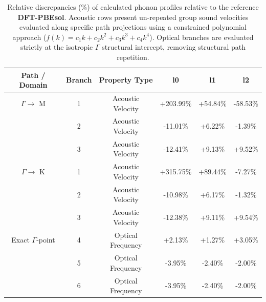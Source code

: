 \begin{table}[htbp]
  \centering
  \caption{Relative discrepancies (\%) of calculated phonon profiles relative to the reference \textbf{DFT-PBEsol}. Acoustic rows present un-repeated group sound velocities evaluated along specific path projections using a constrained polynomial approach ($f(k) = c_1 k + c_2 k^2 + c_3 k^3 + c_4 k^4$). Optical branches are evaluated strictly at the isotropic $\Gamma$ structural intercept, removing structural path repetition.}
  \label{tab:gamma_phonon_comparison}
  \begin{tabular}{cccccc}
    \hline\hline
    Path / Domain & Branch & Property Type  & l0 & l1 & l2 \\
    \hline
    \midrule $\Gamma \rightarrow$ M & 1 & Acoustic Velocity  & +203.99\% & +54.84\% & -58.53\% \\
                                   & 2 & Acoustic Velocity  & -11.01\% & +6.22\% & -1.39\% \\
                                   & 3 & Acoustic Velocity  & -12.41\% & +9.13\% & +9.52\% \\
    \midrule $\Gamma \rightarrow$ K & 1 & Acoustic Velocity  & +315.75\% & +89.44\% & -7.27\% \\
                                   & 2 & Acoustic Velocity  & -10.98\% & +6.17\% & -1.32\% \\
                                   & 3 & Acoustic Velocity  & -12.38\% & +9.11\% & +9.54\% \\
    \midrule Exact $\Gamma$-point  & 4 & Optical Frequency   & +2.13\% & +1.27\% & +3.05\% \\
                                   & 5 & Optical Frequency   & -3.95\% & -2.40\% & -2.00\% \\
                                   & 6 & Optical Frequency   & -3.95\% & -2.40\% & -2.00\% \\
    \hline\hline
  \end{tabular}
\end{table}
